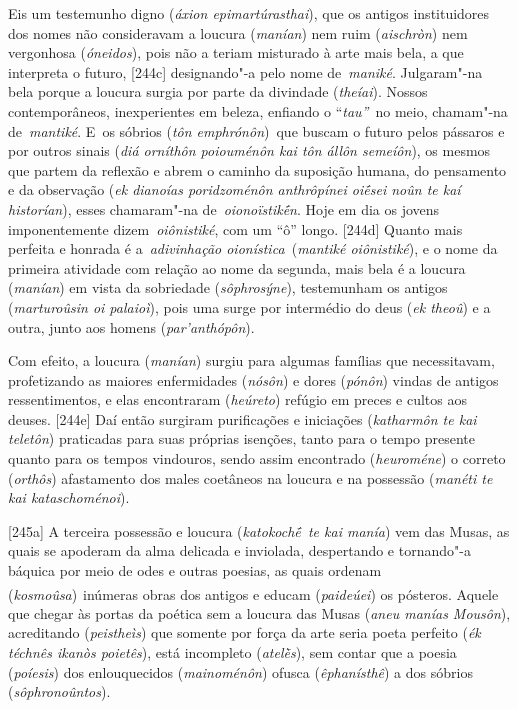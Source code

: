 Eis um testemunho digno (\emph{áxion epimartúrasthai}), que os antigos
instituidores dos nomes não consideravam a loucura (\emph{manían}) nem
ruim (\emph{aischròn}) nem vergonhosa (\emph{óneidos}), pois não a
teriam misturado à arte mais bela, a que interpreta o futuro, [244c]
designando"-a pelo nome de~\emph{maniké}. Julgaram"-na bela porque a
loucura surgia por parte da divindade (\emph{theíai}). Nossos
contemporâneos, inexperientes em beleza, enfiando o ``\emph{tau''}~no
meio, chamam"-na de~\emph{mantiké}. E~os sóbrios (\emph{tôn
emphrónôn})~que buscam o futuro pelos pássaros e por outros sinais
(\emph{diá orníthôn poiouménôn kai tôn állôn semeíôn}), os mesmos que
partem da reflexão e abrem o caminho da suposição humana, do pensamento
e da observação (\emph{ek dianoías poridzoménôn anthrôpínei oiḗsei noûn
te kaí historían}), esses chamaram"-na de~\emph{oionoïstikḗn}. Hoje em
dia os jovens imponentemente dizem~\emph{oiônistiké}, com um ``ô''
longo. [244d] Quanto mais perfeita e honrada é a~\emph{adivinhação
oionística~}(\emph{mantiké oiônistiké}), e o nome da primeira atividade
com relação ao nome da segunda, mais bela é a loucura (\emph{manían}) em
vista da sobriedade (\emph{sôphrosýne}), testemunham os antigos
(\emph{marturoûsin oi palaioì}), pois uma surge por intermédio do deus
(\emph{ek theoû}) e a outra, junto aos homens (\emph{par'anthópôn}).

Com efeito, a loucura (\emph{manían}) surgiu para algumas famílias que
necessitavam, profetizando as maiores enfermidades (\emph{nósôn}) e
dores (\emph{pónôn}) vindas de antigos ressentimentos, e elas
encontraram (\emph{heúreto}) refúgio em preces e cultos aos deuses.
[244e] Daí então surgiram purificações e iniciações (\emph{katharmôn
te kai teletôn}) praticadas para suas próprias isenções, tanto para o
tempo presente quanto para os tempos vindouros, sendo assim encontrado
(\emph{heuroméne}) o correto (\emph{orthôs}) afastamento dos males
coetâneos na loucura e na possessão (\emph{manéti te kai
kataschoménoi}).

[245a] A terceira possessão e loucura (\emph{katokochḗ~te kai
manía}) vem das Musas, as quais se apoderam da alma delicada e
inviolada, despertando e tornando"-a báquica por meio de odes e outras
poesias, as quais ordenam (\emph{kosmoûsa})\textsuperscript{~}inúmeras
obras dos antigos e educam (\emph{paideúei}) os pósteros. Aquele que
chegar às portas da poética sem a loucura das Musas (\emph{aneu manías
Mousôn}), acreditando (\emph{peistheìs}) que somente por força da arte
seria poeta perfeito (\emph{ék téchnês ikanòs poietês}), está incompleto
(\emph{atelḕs}), sem contar que a poesia (\emph{poíesis}) dos
enlouquecidos (\emph{mainoménôn}) ofusca (\emph{êphanísthê}) a dos
sóbrios (\emph{sôphronoûntos}).


